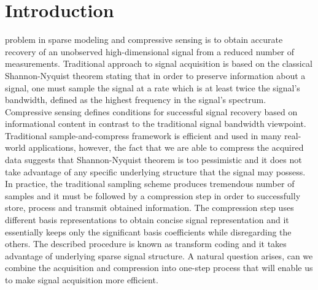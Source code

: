 \documentclass[journal]{IEEEtran}
\begin{document}
\section{Introduction}
% 
% 
% 
% 
 problem in sparse modeling and compressive sensing is to obtain accurate recovery of an unobserved high-dimensional signal from a reduced number of measurements. Traditional approach to signal acquisition is based on the classical Shannon-Nyquist theorem \cite{shannon1949, nyquist1928certain} stating that in order to preserve information about a signal, one must sample the signal at a rate which is at least twice the signal's bandwidth, defined as the highest frequency in the signal's spectrum.  Compressive sensing defines conditions for successful signal recovery based on informational content in contrast to the traditional signal bandwidth viewpoint. Traditional sample-and-compress framework is efficient and used in many real-world applications, however, the fact that we are able to compress the acquired data suggests that Shannon-Nyquist theorem is too pessimistic and it does not take advantage of any specific underlying structure that the signal may possess. In practice, the traditional sampling scheme produces tremendous number of samples and it must be followed by a compression step in order to successfully store, process and transmit obtained information. The compression step uses different basis representations to obtain concise signal representation and it essentially keeps only the significant basis coefficients while disregarding the others. The described procedure is known as transform coding and it takes advantage of underlying sparse signal structure. A natural question arises, can we combine the acquisition and compression into one-step process that will enable us to make signal acquisition more efficient.
\end{document}
